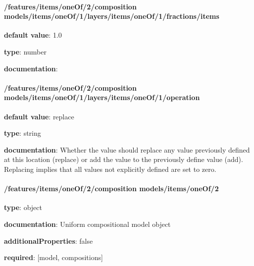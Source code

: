\begin{itemized}
\paragraph{/features/items/oneOf/2/composition models/items/oneOf/1/layers/items/oneOf/1/fractions/items} \begin{itemized}
\item {\bf default value}: 1.0
\item {\bf type}: number
\item {\bf documentation}: 
\end{itemized}\end{itemized}\paragraph{/features/items/oneOf/2/composition models/items/oneOf/1/layers/items/oneOf/1/operation} \begin{itemized}
\item {\bf default value}: replace
\item {\bf type}: string
\item {\bf documentation}: Whether the value should replace any value previously defined at this location (replace) or add the value to the previously define value (add). Replacing implies that all values not explicitly defined are set to zero.
\end{itemized}\paragraph{/features/items/oneOf/2/composition models/items/oneOf/2} \begin{itemized}
\item {\bf type}: object
\item {\bf documentation}: Uniform compositional model object
\item {\bf additionalProperties}: false
\item {\bf required}: [model, compositions]\end{itemized}
